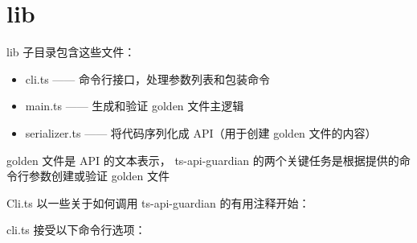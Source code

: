 \section{lib}


lib 子目录包含这些文件：


\begin{itemize}
  \item cli.ts —— 命令行接口，处理参数列表和包装命令
  \item main.ts —— 生成和验证 golden 文件主逻辑
  \item serializer.ts —— 将代码序列化成 API（用于创建 golden 文件的内容）
\end{itemize}


golden 文件是 API 的文本表示，
ts-api-guardian 的两个关键任务是根据提供的命令行参数创建或验证 golden 文件


Cli.ts 以一些关于如何调用 ts-api-guardian 的有用注释开始：




cli.ts 接受以下命令行选项：




